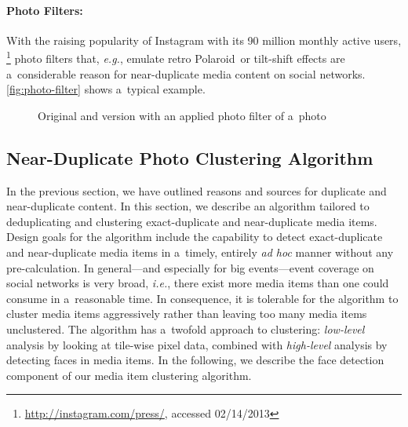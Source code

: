 \paragraph{Photo Filters:}

With the raising popularity of Instagram with its 90 million monthly active users,%
\footnote{\url{http://instagram.com/press/}, accessed 02/14/2013}
photo filters that, \emph{e.g.}, emulate retro Polaroid\texttrademark\ or tilt-shift effects
are a~considerable reason for near-duplicate media content on social networks.
\autoref{fig:photo-filter} shows a~typical example.

\begin{figure}[!ht]
  \centering
  \caption{Original and version with an applied photo filter of a~photo}
  \label{fig:photo-filter}  
\end{figure}

\subsection{Near-Duplicate Photo Clustering Algorithm}
\label{sec:near-duplicate-clustering-algorithm}

In the previous section, we have outlined
reasons and sources for duplicate and near-duplicate content.
In this section, we describe an algorithm tailored to
deduplicating and clustering exact-duplicate and near-duplicate media items.
Design goals for the algorithm include
the capability to detect exact-duplicate and near-duplicate media items
in a~timely, entirely \emph{ad hoc} manner without any pre-calculation.
In general---and especially for big events---event coverage on social networks
is very broad, \emph{i.e.}, there exist more media items
than one could consume in a~reasonable time.
In consequence, it is tolerable for the algorithm to cluster media items aggressively
rather than leaving too many media items unclustered.
The algorithm has a~twofold approach to clustering:
\emph{low-level} analysis by looking at tile-wise pixel data,
combined with \emph{high-level} analysis by detecting faces in media items.
In the following, we describe the face detection component
of our media item clustering algorithm.

